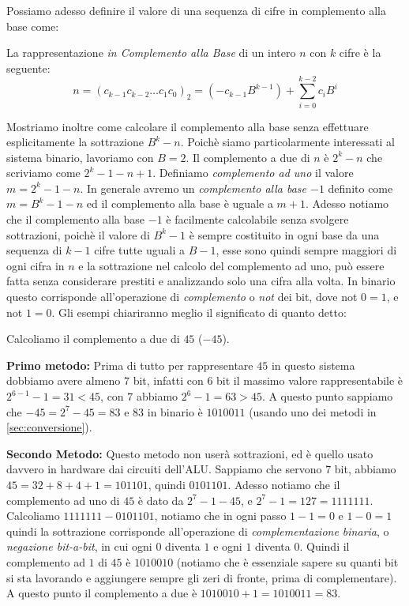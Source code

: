 Possiamo adesso definire il valore di una sequenza di cifre in complemento alla base come:

\begin{defn}
La rappresentazione \emph{in Complemento alla Base} di un intero $n$ 
con $k$ cifre è la seguente:
	\[ n = (c_{k-1}c_{k-2}{\ldots}c_1c_0)_2 = (-c_{k-1}B^{k-1}) + \sum_{i=0}^{k-2}c_iB^i \]
\end{defn}

Mostriamo inoltre come calcolare il complemento alla base senza effettuare
esplicitamente la sottrazione $B^k - n$. Poichè siamo particolarmente
interessati al sistema binario, lavoriamo con $B=2$.  
Il complemento a due di $n$ è $2^k - n$ che scriviamo come $2^k-1-n+1$. Definiamo \emph{complemento ad uno} il valore $m = 2^k-1-n$. In generale avremo un \emph{complemento alla base $-1$} definito come $m = B^k-1-n$ ed il complemento alla base è uguale a $m+1$. 
Adesso notiamo che il complemento alla base $-1$ è facilmente calcolabile
senza svolgere sottrazioni, poichè il valore di $B^k-1$ è sempre costituito in ogni base da una sequenza di $k-1$ cifre tutte uguali a $B-1$, esse sono quindi sempre maggiori di ogni cifra in $n$ e la sottrazione nel calcolo del complemento ad uno, può essere fatta senza considerare prestiti e analizzando solo una cifra alla volta. In binario questo corrisponde all'operazione di \emph{complemento} o \emph{not} dei bit, dove \textsf{not} $0 = 1$, e \textsf{not} $1 = 0$. Gli
esempi chiariranno meglio il significato di quanto detto:

\begin{ex} Calcoliamo il complemento a due di $45$ ($-45$).

\noindent \textbf{Primo metodo:} Prima di tutto per rappresentare $45$ in
questo sistema dobbiamo avere almeno $7$ bit, infatti con $6$ bit il massimo
valore rappresentabile è $2^{6-1}-1 = 31 < 45$, con $7$ abbiamo $2^6-1 =
63>45$. A questo punto sappiamo che $-45 = 2^7-45 = 83$ e $83$ in binario è
$1010011$ (usando uno dei metodi in \ref{sec:conversione}).\medskip

\noindent \textbf{Secondo Metodo:} Questo metodo non userà sottrazioni, ed è
quello usato davvero in hardware dai circuiti dell'ALU. Sappiamo che servono
$7$ bit, abbiamo $45 = 32+8+4+1 = 101101$, quindi $0101101$. Adesso notiamo che
il complemento ad uno di $45$ è dato da $2^7-1-45$, e $2^7-1 = 127 = 1111111$.
Calcoliamo $1111111-0101101$, notiamo che in ogni passo $1-1=0$ e $1-0=1$
quindi la sottrazione corrisponde all'operazione di \emph{complementazione
binaria}, o \emph{negazione bit-a-bit}, in cui ogni $0$ diventa $1$ e ogni $1$
diventa $0$. Quindi il complemento ad $1$ di $45$ è $1010010$ (notiamo che è
essenziale sapere su quanti bit si sta lavorando e aggiungere sempre gli zeri
di fronte, prima di complementare). A questo punto il complemento a due è
$1010010+1 = 1010011 = 83$. \end{ex}

